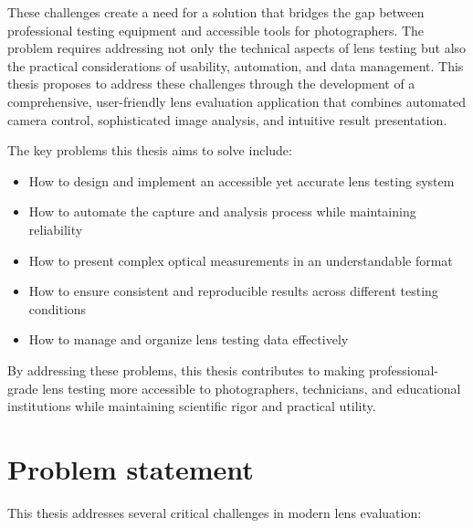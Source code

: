 These challenges create a need for a solution that bridges the gap between professional testing equipment and accessible tools for photographers. The problem requires addressing not only the technical aspects of lens testing but also the practical considerations of usability, automation, and data management. This thesis proposes to address these challenges through the development of a comprehensive, user-friendly lens evaluation application that combines automated camera control, sophisticated image analysis, and intuitive result presentation.

The key problems this thesis aims to solve include:
\begin{itemize}
    \item How to design and implement an accessible yet accurate lens testing system
    \item How to automate the capture and analysis process while maintaining reliability
    \item How to present complex optical measurements in an understandable format
    \item How to ensure consistent and reproducible results across different testing conditions
    \item How to manage and organize lens testing data effectively
\end{itemize}

By addressing these problems, this thesis contributes to making professional-grade lens testing more accessible to photographers, technicians, and educational institutions while maintaining scientific rigor and practical utility.
\section{Problem statement}
This thesis addresses several critical challenges in modern lens evaluation:

